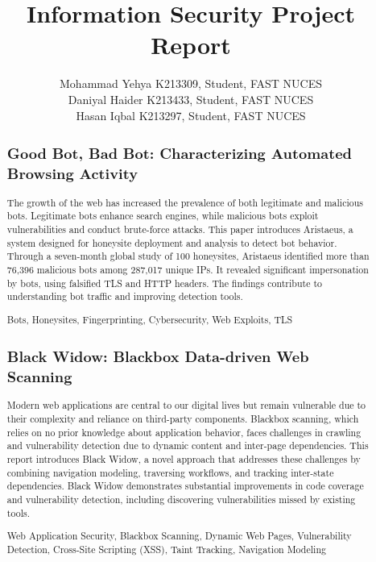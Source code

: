 \documentclass[conference]{IEEEtran}
\begin{document}
\title{Information Security Project Report\\
}


\author{
Mohammad Yehya K213309, Student, FAST NUCES\\
Daniyal Haider K213433, Student, FAST NUCES\\
Hasan Iqbal K213297, Student, FAST NUCES\\
}
\maketitle 


\begin{abstract}
\subsection{Good Bot, Bad Bot: Characterizing Automated Browsing Activity}
The growth of the web has increased the prevalence of both legitimate and malicious bots. Legitimate bots enhance search engines, while malicious bots exploit vulnerabilities and conduct brute-force attacks. This paper introduces Aristaeus, a system designed for honeysite deployment and analysis to detect bot behavior. Through a seven-month global study of 100 honeysites, Aristaeus identified more than 76,396 malicious bots among 287,017 unique IPs. It revealed significant impersonation by bots, using falsified TLS and HTTP headers. The findings contribute to understanding bot traffic and improving detection tools.
\begin{IEEEkeywords}
Bots, Honeysites, Fingerprinting, Cybersecurity, Web Exploits, TLS
\end{IEEEkeywords}

\subsection{Black Widow: Blackbox Data-driven Web Scanning}
Modern web applications are central to our digital lives but remain vulnerable due to their complexity and reliance on third-party components. Blackbox scanning, which relies on no prior knowledge about application behavior, faces challenges in crawling and vulnerability detection due to dynamic content and inter-page dependencies. This report introduces Black Widow, a novel approach that addresses these challenges by combining navigation modeling, traversing workflows, and tracking inter-state dependencies. Black Widow demonstrates substantial improvements in code coverage and vulnerability detection, including discovering vulnerabilities missed by existing tools.\\
\begin{IEEEkeywords}
Web Application Security, Blackbox Scanning, Dynamic Web Pages, Vulnerability Detection, Cross-Site Scripting (XSS), Taint Tracking, Navigation Modeling
\end{IEEEkeywords}


\end{abstract}
\end{document}
